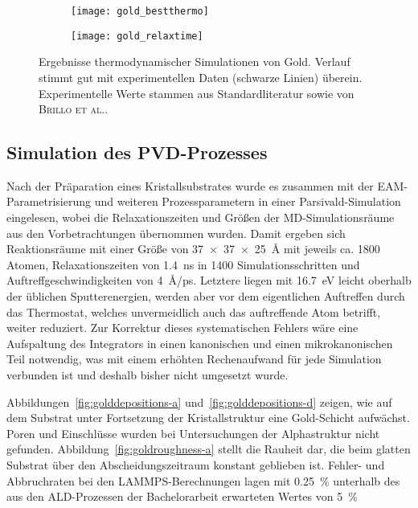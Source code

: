 \begin{figure}
  \captionsetup[subfigure]{singlelinecheck=false}
  \def\subfigwidth{7cm}
  \begin{subfigure}[t]{\subfigwidth}
    \texttt{[image: gold\_bestthermo]}
    \label{fig:goldthermo-a}
  \end{subfigure}
  \hfill
  \begin{subfigure}[t]{\subfigwidth}
    \texttt{[image: gold\_relaxtime]}
    \label{fig:goldthermo-b}
  \end{subfigure}
  \caption[Ergebnisse thermodynamischer Simulationen von Gold]{Ergebnisse thermodynamischer Simulationen von Gold.
    Verlauf stimmt gut mit experimentellen Daten (schwarze Linien) überein.
    Experimentelle Werte stammen aus Standardliteratur sowie von \textsc{Brillo et al.}\cite{brillo_density_2006}.
  }
  \label{fig:goldthermo}
\end{figure}

\subsection{Simulation des PVD-Prozesses}

Nach der Präparation eines Kristallsubstrates wurde es zusammen mit der EAM-Parametrisierung und weiteren Prozessparametern in einer Parsivald-Simulation eingelesen, wobei die Relaxationszeiten und Größen der MD-Simulationsräume aus den Vorbetrachtungen übernommen wurden.
Damit ergeben sich Reaktionsräume mit einer Größe von \SI{37x37x25}{\angstrom} mit jeweils ca. \num{1800} Atomen, Relaxationszeiten von \SI{1.4}{\nano\second} in \num{1400} Simulationsschritten und Auftreffgeschwindigkeiten von \SI{4}{\angstrom/\pico\second}.
Letztere liegen mit \SI{16.7}{\electronvolt} leicht oberhalb der üblichen Sputterenergien, werden aber vor dem eigentlichen Auftreffen durch das Thermostat, welches unvermeidlich auch das auftreffende Atom betrifft, weiter reduziert.
Zur Korrektur dieses systematischen Fehlers wäre eine Aufspaltung des Integrators in einen kanonischen und einen mikrokanonischen Teil notwendig, was mit einem erhöhten Rechenaufwand für jede Simulation verbunden ist und deshalb bisher nicht umgesetzt wurde.

Abbildungen~\ref{fig:golddepositions-a} und~\ref{fig:golddepositions-d} zeigen, wie auf dem Substrat unter Fortsetzung der Kristallstruktur eine Gold-Schicht aufwächst.
Poren und Einschlüsse wurden bei Untersuchungen der Alphastruktur nicht gefunden.
Abbildung~\ref{fig:goldroughness-a} stellt die Rauheit dar, die beim glatten Substrat über den Abscheidungszeitraum konstant geblieben ist.
Fehler- und Abbruchraten bei den LAMMPS-Berechnungen lagen mit \SI{0.25}{\percent} unterhalb des aus den ALD-Prozessen der Bachelorarbeit erwarteten Wertes von \SI{5}{\percent}

